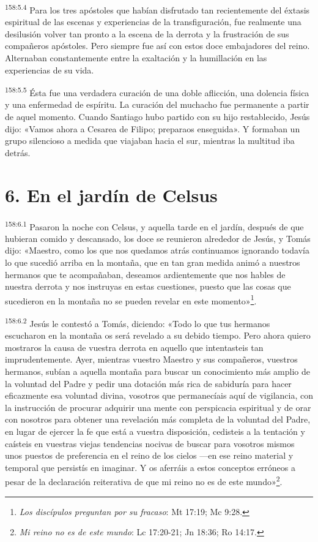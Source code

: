 {\par 
\textsuperscript{158:5.4} Para los tres apóstoles que habían disfrutado tan recientemente del éxtasis espiritual de las escenas y experiencias de la transfiguración, fue realmente una desilusión volver tan pronto a la escena de la derrota y la frustración de sus compañeros apóstoles. Pero siempre fue así con estos doce embajadores del reino. Alternaban constantemente entre la exaltación y la humillación en las experiencias de su vida.

\par 
\textsuperscript{158:5.5} Ésta fue una verdadera curación de una doble aflicción, una dolencia física y una enfermedad de espíritu. La curación del muchacho fue permanente a partir de aquel momento. Cuando Santiago hubo partido con su hijo restablecido, Jesús dijo: «Vamos ahora a Cesarea de Filipo; preparaos enseguida». Y formaban un grupo silencioso a medida que viajaban hacia el sur, mientras la multitud iba detrás.

\section*{6. En el jardín de Celsus}
\par 
\textsuperscript{158:6.1} Pasaron la noche con Celsus, y aquella tarde en el jardín, después de que hubieran comido y descansado, los doce se reunieron alrededor de Jesús, y Tomás dijo: «Maestro, como los que nos quedamos atrás continuamos ignorando todavía lo que sucedió arriba en la montaña, que en tan gran medida animó a nuestros hermanos que te acompañaban, deseamos ardientemente que nos hables de nuestra derrota y nos instruyas en estas cuestiones, puesto que las cosas que sucedieron en la montaña no se pueden revelar en este momento»\footnote{\textit{Los discípulos preguntan por su fracaso}: Mt 17:19; Mc 9:28.}.

\par 
\textsuperscript{158:6.2} Jesús le contestó a Tomás, diciendo: «Todo lo que tus hermanos escucharon en la montaña os será revelado a su debido tiempo. Pero ahora quiero mostraros la causa de vuestra derrota en aquello que intentasteis tan imprudentemente. Ayer, mientras vuestro Maestro y sus compañeros, vuestros hermanos, subían a aquella montaña para buscar un conocimiento más amplio de la voluntad del Padre y pedir una dotación más rica de sabiduría para hacer eficazmente esa voluntad divina, vosotros que permanecíais aquí de vigilancia, con la instrucción de procurar adquirir una mente con perspicacia espiritual y de orar con nosotros para obtener una revelación más completa de la voluntad del Padre, en lugar de ejercer la fe que está a vuestra disposición, cedisteis a la tentación y caísteis en vuestras viejas tendencias nocivas de buscar para vosotros mismos unos puestos de preferencia en el reino de los cielos ---en ese reino material y temporal que persistís en imaginar. Y os aferráis a estos conceptos erróneos a pesar de la declaración reiterativa de que mi reino no es de este mundo»\footnote{\textit{Mi reino no es de este mundo}: Lc 17:20-21; Jn 18:36; Ro 14:17.}.

}
